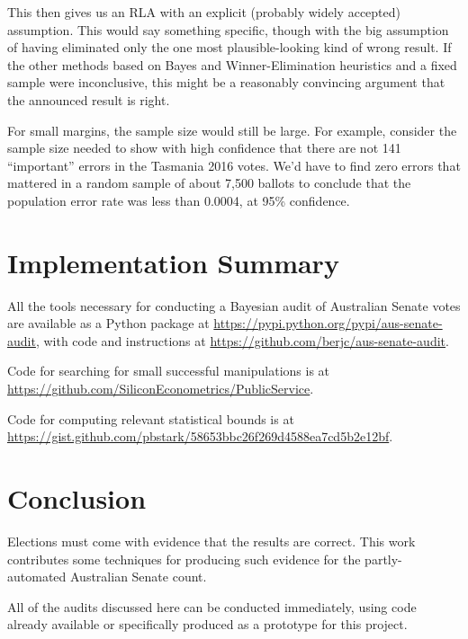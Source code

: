 \documentclass[10pt,a4paper]{article}
\newcommand{\VTNote}[1]{}
\begin{document}
{\VTNote{
Then all we need is a way to tally up errors which all count somewhere between 0 and $1/qM$ towards the same margin.  Can I adapt MACRO from ``Conservative statistical post-election audits''? Or is there a reason that multiple-voting doesn't necessarily correspond to different magnitudes of shift?}

This then gives us an RLA with an explicit (probably widely accepted) assumption.  This would say something specific, though with the big assumption of having eliminated only the one most plausible-looking kind of wrong result.  If the other methods based on Bayes and Winner-Elimination heuristics and a fixed sample were inconclusive, this might be a reasonably convincing argument that the announced result is right.  

For small margins, the sample size would still be large.  
For example, consider the sample size needed to show with high confidence that there are not 141 ``important'' errors in the Tasmania 2016 votes.
We'd have to find zero errors that mattered in a random sample of about 7,500 ballots to conclude that the population error rate was less than 0.0004, at 95\% confidence.
}%

\section{Implementation Summary}
All the tools necessary for conducting a Bayesian audit of Australian Senate votes are available as a Python package at \url{https://pypi.python.org/pypi/aus-senate-audit}, with code and instructions at \url{https://github.com/berjc/aus-senate-audit}.

Code for searching for small successful manipulations is at \url{https://github.com/SiliconEconometrics/PublicService}.

Code for computing relevant statistical bounds is at \url{https://gist.github.com/pbstark/58653bbc26f269d4588ea7cd5b2e12bf}.

\section{Conclusion}
Elections must come with evidence that the results are correct.  This work contributes some techniques for producing such evidence for the partly-automated Australian Senate count.

All of the audits discussed here can be conducted immediately, using code already available or specifically produced as a prototype for this project.
\end{document}
